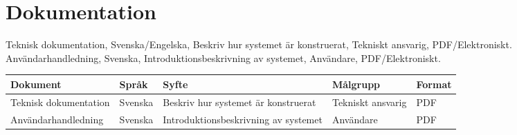 \section{Dokumentation}
Teknisk dokumentation, Svenska/Engelska, Beskriv hur systemet är konstruerat, Tekniskt ansvarig, PDF/Elektroniskt.
Användarhandledning, Svenska, Introduktionsbeskrivning av systemet, Användare, PDF/Elektroniskt.

\begin{center}
	\begin{table}[h]
		\begin{tabularx}{\textwidth}{| l | l | X | l | l |}
			\hline
			\textbf{Dokument} & \textbf{Språk} & \textbf{Syfte} & \textbf{Målgrupp} & \textbf{Format} \\
			\hline
			Teknisk dokumentation & Svenska & Beskriv hur systemet är konstruerat & Tekniskt ansvarig & PDF \\
			\hline
			Användarhandledning & Svenska & Introduktionsbeskrivning av systemet & Användare & PDF \\
			\hline
		\end{tabularx}
	\end{table}
\end{center}